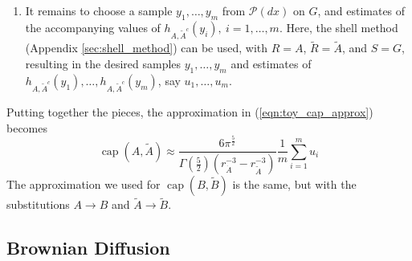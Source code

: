 \documentclass[12pt, nofootinbib,english, amsmath, amssymb, aps, priprint, graphicx,floatfix]{revtex4-1}
\theoremstyle{plain}
\theoremstyle{definition}
\theoremstyle{plain}
\newcommand{\capac}[2]{\ensuremath{\operatorname{cap}}(#1,#2)}
\newcommand{\PMeasure}{\mathscr{P}(dx)}
\newcommand{\dA}{{\dot A}}
\newcommand{\tA}{{\tilde A}}
\newcommand{\tB}{{\tilde B}}
\begin{document}
\begin{enumerate}
\item  It remains to choose a sample $y_1,\ldots,y_m$ from $\PMeasure$ on $G$, and estimates of the accompanying values of $h_{A,\tA^c}(y_i),\ i=1,\ldots,m$. Here, the shell method (Appendix \ref{sec:shell_method}) can be used, with $R=A$, $\tilde{R}=\tA$, and $S=G$, resulting in the desired samples $y_1,\ldots,y_m$ and estimates of $h_{A,\tA^c}(y_1),
\ldots,h_{A,\tA^c}(y_m)$,  say $u_1,\ldots,u_m$.

\end{enumerate}

Putting together the pieces, the approximation in (\ref{eqn:toy_cap_approx}) becomes
\begin{equation}
\label{eqn:approx_capacities}
\capac{A}{\tilde A} \approx
\frac{6\pi^{\frac{5}{2}}}
{\Gamma(\frac{5}{2})(r_\dA^{-3} - r_\tA^{-3})} 
\frac{1}{m}\sum_{i=1}^m u_i
\end{equation}
The approximation we used for $\capac{B}{\tB}$ is the same, but with the substitutions $A\to B$ and $\tA\to\tB$.

\subsection{Brownian Diffusion}
\label{sec:B_D}

\begin{figure}
\end{figure}
\end{document}
